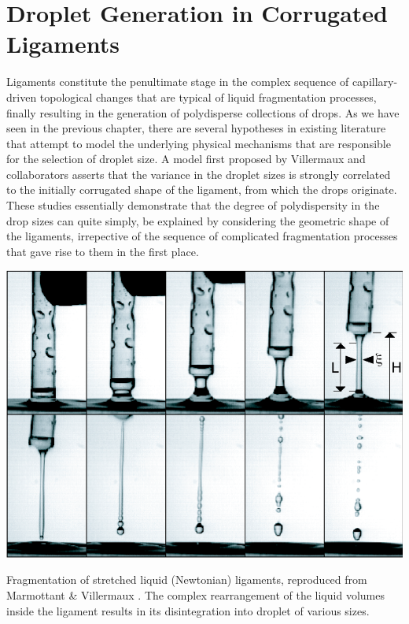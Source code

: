 \setchapterpreamble[u]{\margintoc}

\chapter{Droplet Generation in Corrugated Ligaments}


Ligaments constitute the penultimate stage in the complex sequence 
of capillary-driven topological changes that are 
typical of liquid fragmentation processes, 
finally resulting in the generation of polydisperse collections of drops. 
As we have seen in the previous chapter, there are several hypotheses 
in existing literature  
that attempt to model the underlying physical mechanisms 
that are responsible for the selection of droplet size. 
A model first proposed by Villermaux and collaborators 
asserts that the variance in the droplet sizes is strongly 
correlated to the initially corrugated shape of the 
ligament, from which the drops originate. 
These studies essentially demonstrate that the degree of polydispersity 
in the drop sizes can quite simply, be explained by considering the 
geometric shape of the ligaments, irrepective of the sequence of 
complicated fragmentation processes that gave rise to them in the first place.  


\begin{marginfigure}[4cm]
\centering
\includegraphics{plots/ligament_breakup/lig_mar_vill_pof04.png}
\caption{Fragmentation of stretched liquid (Newtonian) ligaments, reproduced 
	from Marmottant \& Villermaux \cite{vill_3}.
       	The complex rearrangement of the liquid volumes 
	inside the ligament results in its disintegration 
	into droplet of various sizes. 
	}
\end{marginfigure}

